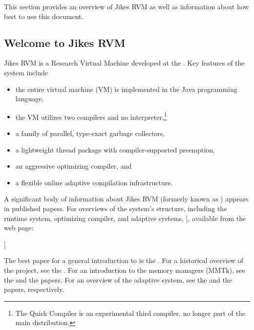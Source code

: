 This section provides an overview of Jikes\TMweb{} RVM as well as
information about how best to use this document.

\subsection{Welcome to Jikes RVM}

Jikes\TMboth{} RVM is a Research Virtual Machine 
 developed at the 
\Rboth{}
.  Key
features of the system include
\begin{itemize}
\item the entire virtual machine (VM) is implemented in the
  Java\TMboth{} programming language,
\item the VM utilizes two compilers and no interpreter,\footnote{The
Quick Compiler is an experimental third compiler, no longer part of the main distribution.}
\item a family of parallel, type-exact garbage collectors,
\item a lightweight thread package with compiler-supported preemption,
\item an aggressive optimizing compiler, and 
\item a flexible online adaptive compilation infrastructure.
\end{itemize}

A significant body of information about Jikes RVM 
(formerly known as 
\xlink{\jp}{\JalapenoHomeURL}) appears 
in published
papers.  For overviews of the system's structure, including the runtime system,
optimizing compiler, and adaptive systems, [, available from the \jrvm{} web page:
\begin{quote}
\texttt{\RVMPubsURL}
\end{quote}
]{\RVMPubsURL}

The best paper for a general introduction to \jrvm{} is the 
.  
For a historical overview of the project, see the
.
%
For an introduction to the memory managers (MMTk), see the 
and the
papers.
For an overview of the adaptive system, see the
and the
papers, respectively.

